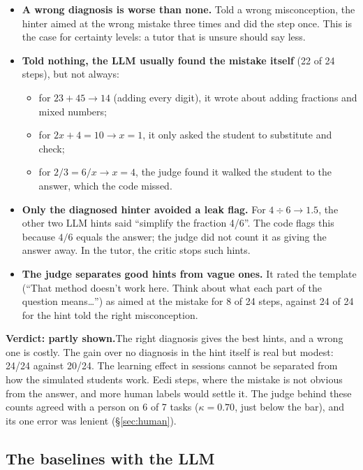 \documentclass[11pt,a4paper]{article}
\begin{document}
\begin{itemize}
  \item \textbf{A wrong diagnosis is worse than none.} Told a wrong misconception, the hinter aimed at the wrong mistake three times and did the step once. This is the case for certainty levels: a tutor that is unsure should say less.
  \item \textbf{Told nothing, the LLM usually found the mistake itself} (22 of 24 steps), but not always:
  \begin{itemize}
    \item for $23 + 45 \to 14$ (adding every digit), it wrote about adding fractions and mixed numbers;
    \item for $2x + 4 = 10 \to x = 1$, it only asked the student to substitute and check;
    \item for $2/3 = 6/x \to x = 4$, the judge found it walked the student to the answer, which the code missed.
  \end{itemize}
  \item \textbf{Only the diagnosed hinter avoided a leak flag.} For $4 \div 6 \to 1.5$, the other two LLM hints said ``simplify the fraction 4/6''. The code flags this because $4/6$ equals the answer; the judge did not count it as giving the answer away. In the tutor, the critic stops such hints.
  \item \textbf{The judge separates good hints from vague ones.} It rated the template (``That method doesn't work here. Think about what each part of the question means\ldots'') as aimed at the mistake for 8 of 24 steps, against 24 of 24 for the hint told the right misconception.
\end{itemize}

\begin{verdict}
{\sffamily\bfseries\color{primary}Verdict: partly shown.}\enspace The right diagnosis gives the best hints, and a wrong one is costly. The gain over no diagnosis in the hint itself is real but modest: 24/24 against 20/24. The learning effect in sessions cannot be separated from how the simulated students work. Eedi steps, where the mistake is not obvious from the answer, and more human labels would settle it. The judge behind these counts agreed with a person on 6 of 7 tasks ($\kappa = 0.70$, just below the bar), and its one error was lenient (\S\ref{sec:human}).
\end{verdict}


\subsection{The baselines with the LLM}\label{sec:baselines}
\end{document}
